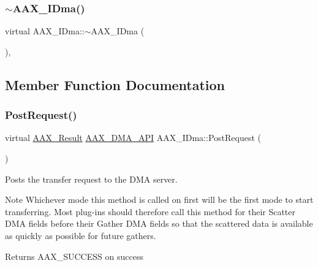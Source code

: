 \subsubsection{\texorpdfstring{$\sim$AAX\_IDma()}{~AAX\_IDma()}}
{\footnotesize\ttfamily virtual A\+A\+X\+\_\+\+I\+Dma\+::$\sim$\+A\+A\+X\+\_\+\+I\+Dma (\begin{DoxyParamCaption}{ }\end{DoxyParamCaption})\hspace{0.3cm}{\ttfamily [inline]}, {\ttfamily [virtual]}}



\subsection{Member Function Documentation}
\mbox{\label{a01809_ac732944930f4fce9c47b59fe278eddc1}} 
\subsubsection{\texorpdfstring{PostRequest()}{PostRequest()}}
{\footnotesize\ttfamily virtual \mbox{\hyperlink{a00392_a4d8f69a697df7f70c3a8e9b8ee130d2f}{A\+A\+X\+\_\+\+Result}} \mbox{\hyperlink{a00587_acae60d01e5e4bd3282369d0d9d378f3f}{A\+A\+X\+\_\+\+D\+M\+A\+\_\+\+A\+PI}} A\+A\+X\+\_\+\+I\+Dma\+::\+Post\+Request (\begin{DoxyParamCaption}{ }\end{DoxyParamCaption})\hspace{0.3cm}{\ttfamily [pure virtual]}}



Posts the transfer request to the D\+MA server. 

\begin{DoxyNote}{Note}
Whichever mode this method is called on first will be the first mode to start transferring. Most plug-\/ins should therefore call this method for their Scatter D\+MA fields before their Gather D\+MA fields so that the scattered data is available as quickly as possible for future gathers.
\end{DoxyNote}
\begin{DoxyReturn}{Returns}
{\ttfamily A\+A\+X\+\_\+\+S\+U\+C\+C\+E\+SS} on success 
\end{DoxyReturn}
\mbox{\label{a01809_a44981285d022e5ddee41d903eed68a7d}} 
